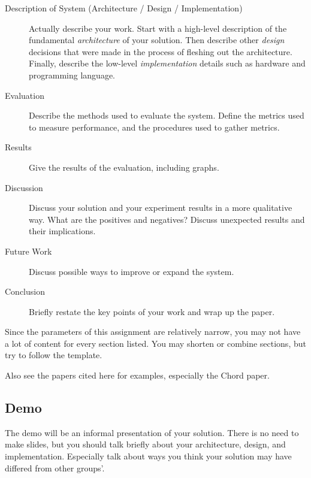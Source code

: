 \documentclass[a4paper]{article}
\begin{document}
\begin{itemize}
\begin{description}
            \item[Description of System (Architecture / Design / Implementation)]
                Actually describe your work.
                Start with a high-level description of the fundamental \textit{architecture} of your solution.
                Then describe other \textit{design} decisions that were made in the process of fleshing out the architecture.
                Finally, describe the low-level \textit{implementation} details
                such as hardware and programming language.

            \item[Evaluation]
                Describe the methods used to evaluate the system.
                Define the metrics used to measure performance,
                and the procedures used to gather metrics.

            \item[Results]
                Give the results of the evaluation, including graphs.

            \item[Discussion]
                Discuss your solution and your experiment results in a more qualitative way. What are the positives and negatives?
                Discuss unexpected results and their implications.

            \item[Future Work]
                Discuss possible ways to improve or expand the system.

            \item[Conclusion]
                Briefly restate the key points of your work and wrap up the paper.

        \end{description}


        Since the parameters of this assignment are relatively narrow,
        you may not have a lot of content for every section listed.
        You may shorten or combine sections,
        but try to follow the template.

        Also see the papers cited here for examples, especially the Chord paper.

\end{itemize}

\subsection{Demo}

The demo will be an informal presentation of your solution.
There is no need to make slides,
but you should talk briefly about your architecture, design, and implementation.
Especially talk about ways you think your solution may have differed from other groups'.
\end{document}
